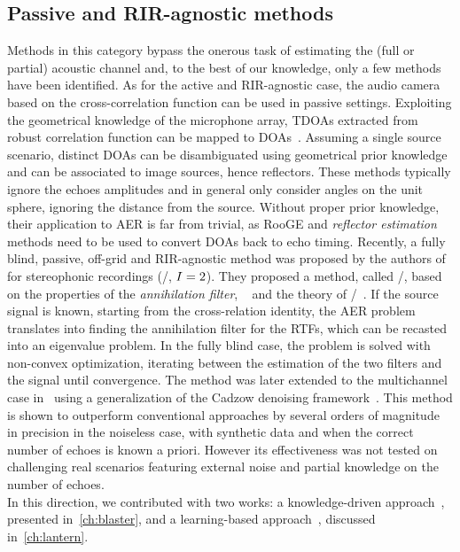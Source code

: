 \subsection{Passive and RIR-agnostic methods}
Methods in this category bypass the onerous task of estimating the (full or partial) acoustic channel and, to the best of our knowledge, only a few methods have been identified.
As for the active and RIR-agnostic case, the audio camera based on the cross-correlation function can be used in passive settings.
Exploiting the geometrical knowledge of the microphone array, \acp{TDOA} extracted from robust correlation function can be mapped to \acp{DOA}~.
Assuming a single source scenario, distinct \acp{DOA} can be disambiguated using geometrical prior knowledge and can be associated to image sources, hence reflectors.
These methods typically ignore the echoes amplitudes and in general only consider angles on the unit sphere, ignoring the distance from the source.
Without proper prior knowledge, their application to \ac{AER} is far from trivial, as \ac{RooGE} and \textit{reflector estimation} methods need to be used to convert \acp{DOA} back to echo timing.
\mynewline
Recently, a fully blind, passive, off-grid and RIR-agnostic method was proposed by the authors of~ for stereophonic recordings (\ie/, $I=2$).
They proposed a method, called \MULAN/, based on the properties of the \textit{annihilation filter},
~ and the theory of \FRI/~.
If the source signal is known, starting from the cross-relation identity, the \ac{AER} problem translates into finding the annihilation filter for the \acp{RTF}, which can be recasted into an eigenvalue problem.
In the fully blind case, the problem is solved with non-convex optimization, iterating between the estimation of the two filters and the signal until convergence.
The method was later extended to the multichannel case in~ using a generalization of the Cadzow denoising framework~.
This method is shown to outperform conventional approaches by several orders of magnitude in precision in the noiseless case, with synthetic data and when the correct number of echoes is known a priori.
However its effectiveness was not tested on challenging real scenarios featuring external noise and partial knowledge on the number of echoes.
\\In this direction, we contributed with two works: a knowledge-driven approach~, presented in~\cref{ch:blaster}, and a learning-based approach~, discussed in~\cref{ch:lantern}.

